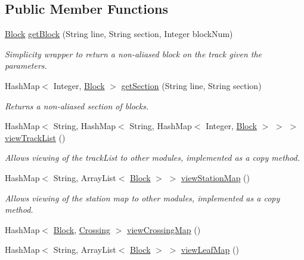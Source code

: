 \subsection*{Public Member Functions}
\begin{DoxyCompactItemize}
\item 
\hyperlink{classTrackModel_1_1Block}{Block} \hyperlink{classTrackModel_1_1TrackModel_a670006658bfbfc272c1097de1080d17c}{get\+Block} (String line, String section, Integer block\+Num)
\begin{DoxyCompactList}\small\item\em Simplicity wrapper to return a non-\/aliased block on the track given the parameters. \end{DoxyCompactList}\item 
Hash\+Map$<$ Integer, \hyperlink{classTrackModel_1_1Block}{Block} $>$ \hyperlink{classTrackModel_1_1TrackModel_a19d3841da17500d43607ce4f37fc2de9}{get\+Section} (String line, String section)
\begin{DoxyCompactList}\small\item\em Returns a non-\/aliased section of blocks. \end{DoxyCompactList}\item 
Hash\+Map$<$ String, Hash\+Map$<$ String, Hash\+Map$<$ Integer, \hyperlink{classTrackModel_1_1Block}{Block} $>$ $>$ $>$ \hyperlink{classTrackModel_1_1TrackModel_ae74a6b0938494affe4c2b96b7b8f288a}{view\+Track\+List} ()
\begin{DoxyCompactList}\small\item\em Allows viewing of the track\+List to other modules, implemented as a copy method. \end{DoxyCompactList}\item 
Hash\+Map$<$ String, Array\+List$<$ \hyperlink{classTrackModel_1_1Block}{Block} $>$ $>$ \hyperlink{classTrackModel_1_1TrackModel_ae43164d0e8478c2bc5ffc3b013f49e60}{view\+Station\+Map} ()
\begin{DoxyCompactList}\small\item\em Allows viewing of the station map to other modules, implemented as a copy method. \end{DoxyCompactList}\item 
Hash\+Map$<$ \hyperlink{classTrackModel_1_1Block}{Block}, \hyperlink{classTrackModel_1_1Crossing}{Crossing} $>$ \hyperlink{classTrackModel_1_1TrackModel_a5f9d06be603a4aee4d29da60276b0383}{view\+Crossing\+Map} ()
\item 
Hash\+Map$<$ String, Array\+List$<$ \hyperlink{classTrackModel_1_1Block}{Block} $>$ $>$ \hyperlink{classTrackModel_1_1TrackModel_a03ca2c29d73dd39a2dfb3e0342fe4e27}{view\+Leaf\+Map} ()

\end{DoxyCompactItemize}
